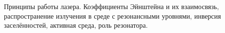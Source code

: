 \documentclass[__main__.tex]{subfiles}
\begin{document}
Принципы работы лазера. Коэффициенты Эйнштейна и их взаимосвязь, распространение излучения в среде с резонансными уровнями, инверсия заселённостей, активная среда, роль резонатора.\\ 

\end{document}
